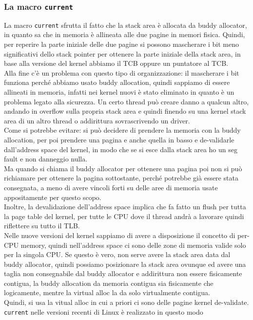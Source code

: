 \documentclass[12pt, oneside]{extbook}
\begin{document}
\subsubsection{La macro \texttt{current}}
La macro \texttt{current} sfrutta il fatto che la stack area è allocata da buddy allocator, in quanto sa che in memoria è allineata alle due pagine in memori fisica. Quindi, per reperire la parte iniziale delle due pagine si possono mascherare i bit meno significativi dello stack pointer per ottenere la parte iniziale della stack area, in base alla versione del kernel abbiamo il TCB oppure un puntatore al TCB.\\Alla fine c'è un problema con questo tipo di organizzazione: il mascherare i bit funziona perché abbiamo usato buddy allocation, quindi sappiamo di essere allineati in memoria, infatti nei kernel nuovi è stato eliminato in quanto è un problema legato alla sicurezza. Un certo thread può creare danno a qualcun altro, andando in overflow sulla propria stack area e quindi finendo su una kernel stack area di un altro thread o addirittura sovrascrivendo un driver.\\Come si potrebbe evitare: si può decidere di prendere la memoria con la buddy allocation, per poi prendere una pagina e anche quella in basso e de-validarle dall'address space del kernel, in modo che se si esce dalla stack area ho un seg fault e non danneggio nulla.\\Ma quando si chiama il buddy allocator per ottenere una pagina poi non si può richiamare per ottenere la pagina sottostante, perché potrebbe già essere stata consegnata, a meno di avere vincoli forti su delle aree di memoria usate appositamente per questo scopo.\\Inoltre, la devalidazione dell'address space implica che fa fatto un flush per tutta la page table del kernel, per tutte le CPU dove il thread andrà a lavorare quindi riflettere su tutto il TLB.\\Nelle nuove versioni del kernel sappiamo di avere a disposizione il concetto di per-CPU memory, quindi nell'address space ci sono delle zone di memoria valide solo per la singola CPU. Se questo è vero, non serve avere la stack area data dal buddy allocator, quindi possiamo posizionare la stack area ovunque ed avere una taglia non consegnabile dal buddy allocator e addirittura non essere fisicamente contigua, la buddy allocation da memoria contigua sia fisicamente che logicamente, mentre la virtual alloc la da solo virtualmente contigua.\\Quindi, si usa la vitual alloc in cui a priori ci sono delle pagine kernel de-validate.\\ \texttt{current} nelle versioni recenti di Linux è realizzato in questo modo
\end{document}

